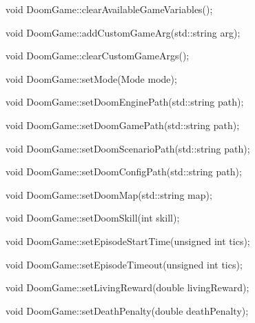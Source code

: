 \documentclass[english,bachelor,a4paper,twoside]{ppfcmthesis}
\begin{document}
\begin{clinee}
void DoomGame::clearAvailableGameVariables();
\end{clinee}
	

\begin{clinee}
void DoomGame::addCustomGameArg(std::string arg);
\end{clinee}


\begin{clinee}
void DoomGame::clearCustomGameArgs();
\end{clinee}


\begin{clinee}
void DoomGame::setMode(Mode mode);
\end{clinee}
	

\begin{clinee}
void DoomGame::setDoomEnginePath(std::string path);
\end{clinee}


\begin{clinee}
void DoomGame::setDoomGamePath(std::string path);
\end{clinee}


\begin{clinee}
void DoomGame::setDoomScenarioPath(std::string path);
\end{clinee}


\begin{clinee}
void DoomGame::setDoomConfigPath(std::string path);
\end{clinee}


\begin{clinee}
void DoomGame::setDoomMap(std::string map);
\end{clinee}
	

\begin{clinee}      
void DoomGame::setDoomSkill(int skill);
\end{clinee}
	

\begin{clinee}    
void DoomGame::setEpisodeStartTime(unsigned int tics);
\end{clinee}


\begin{clinee}
void DoomGame::setEpisodeTimeout(unsigned int tics);
\end{clinee}


\begin{clinee}
void DoomGame::setLivingReward(double livingReward);
\end{clinee}


\begin{clinee}
void DoomGame::setDeathPenalty(double deathPenalty);
\end{clinee}
	
\end{document}
